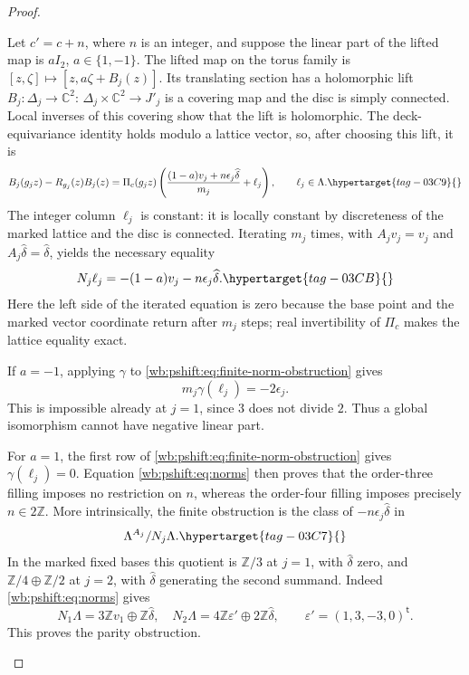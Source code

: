 \begin{proof}
\begin{enumerate}[label=\arabic*.,leftmargin=*]
Let $c'=c+n$, where $n$ is an integer, and suppose the linear part of
the lifted map is $aI_2$, $a\in\{1,-1\}$. The lifted map on the torus
family is $[z,\zeta]\mapsto[z,a\zeta+B_j(z)]$. Its translating
section has a holomorphic lift $B_j:\Delta_j\to\mathbb C^2$:
$\Delta_j\times\mathbb C^2\to J'_j$ is a covering map and the disc is
simply connected. Local inverses of this covering show that the lift
is holomorphic. The deck-equivariance identity holds modulo a
lattice vector, so, after choosing this lift, it is
\begin{equation}
 B_j(g_jz)-R_{g_j}(z)B_j(z)
  =\Pi_c(g_jz)\left(
       \frac{(1-a)v_j+n\epsilon_j\widehat\delta}{m_j}
          +\ell_j\right),\qquad \ell_j\in\Lambda.
 \hypertarget{tag-03C9}{}\label{wb:pshift:eq:finite-equation}
\end{equation}
The integer column $\ell_j$ is constant: it is locally constant by
discreteness of the marked lattice and the disc is connected.
Iterating $m_j$ times, with $A_jv_j=v_j$ and
$A_j\widehat\delta=\widehat\delta$, yields the necessary equality
\begin{equation}
 N_j\ell_j=-(1-a)v_j-n\epsilon_j\widehat\delta.
 \hypertarget{tag-03CB}{}\label{wb:pshift:eq:finite-norm-obstruction}
\end{equation}
Here the left side of the iterated equation is zero because the
base point and the marked vector coordinate return after $m_j$
steps; real invertibility of $\Pi_c$ makes the lattice equality exact.

If $a=-1$, applying $\gamma$ to \eqref{wb:pshift:eq:finite-norm-obstruction} gives
\[
                   m_j\gamma(\ell_j)=-2\epsilon_j.
\]
This is impossible already at $j=1$, since $3$ does not divide $2$.
Thus a global isomorphism cannot have negative linear part.

For $a=1$, the first row of \eqref{wb:pshift:eq:finite-norm-obstruction} gives $\gamma(\ell_j)=0$.
Equation \eqref{wb:pshift:eq:norms} then proves that the order-three filling imposes no
restriction on $n$, whereas the order-four filling imposes precisely
$n\in2\mathbb Z$. More intrinsically, the finite obstruction is the
class of $-n\epsilon_j\widehat\delta$ in
\begin{equation}
 \Lambda^{A_j}/N_j\Lambda.
 \hypertarget{tag-03C7}{}\label{wb:pshift:eq:finite-class}
\end{equation}
In the marked fixed bases this quotient is
$\mathbb Z/3$ at $j=1$, with $\widehat\delta$ zero, and
$\mathbb Z/4\oplus\mathbb Z/2$ at $j=2$, with
$\widehat\delta$ generating the second summand. Indeed \eqref{wb:pshift:eq:norms} gives
\[
 N_1\Lambda=3\mathbb Z v_1\oplus\mathbb Z\widehat\delta,
 \quad
 N_2\Lambda=4\mathbb Z\varepsilon'\oplus
                      2\mathbb Z\widehat\delta,
 \qquad \varepsilon'=(1,3,-3,0)^{\mathsf t}.
\]
This proves the parity obstruction.
\end{enumerate}
\end{proof}
